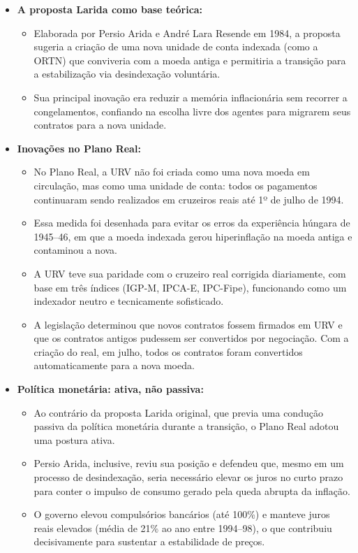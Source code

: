 \documentclass[a4paper,12pt]{article}[abntex2]
\begin{document}
\begin{itemize}

    \item \textbf{A proposta Larida como base teórica:}
    \begin{itemize}
        \item Elaborada por Persio Arida e André Lara Resende em 1984, a proposta sugeria a criação de uma nova unidade de conta indexada (como a ORTN) que conviveria com a moeda antiga e permitiria a transição para a estabilização via desindexação voluntária.
        \item Sua principal inovação era reduzir a memória inflacionária sem recorrer a congelamentos, confiando na escolha livre dos agentes para migrarem seus contratos para a nova unidade.
    \end{itemize}

    \item \textbf{Inovações no Plano Real:}
    \begin{itemize}
        \item No Plano Real, a URV não foi criada como uma nova moeda em circulação, mas como uma unidade de conta: todos os pagamentos continuaram sendo realizados em cruzeiros reais até 1º de julho de 1994.
        \item Essa medida foi desenhada para evitar os erros da experiência húngara de 1945–46, em que a moeda indexada gerou hiperinflação na moeda antiga e contaminou a nova.
        \item A URV teve sua paridade com o cruzeiro real corrigida diariamente, com base em três índices (IGP-M, IPCA-E, IPC-Fipe), funcionando como um indexador neutro e tecnicamente sofisticado.
        \item A legislação determinou que novos contratos fossem firmados em URV e que os contratos antigos pudessem ser convertidos por negociação. Com a criação do real, em julho, todos os contratos foram convertidos automaticamente para a nova moeda.
    \end{itemize}

    \item \textbf{Política monetária: ativa, não passiva:}
    \begin{itemize}
        \item Ao contrário da proposta Larida original, que previa uma condução passiva da política monetária durante a transição, o Plano Real adotou uma postura ativa.
        \item Persio Arida, inclusive, reviu sua posição e defendeu que, mesmo em um processo de desindexação, seria necessário elevar os juros no curto prazo para conter o impulso de consumo gerado pela queda abrupta da inflação.
        \item O governo elevou compulsórios bancários (até 100\%) e manteve juros reais elevados (média de 21\% ao ano entre 1994–98), o que contribuiu decisivamente para sustentar a estabilidade de preços.
    \end{itemize}


\end{itemize}
\end{document}
